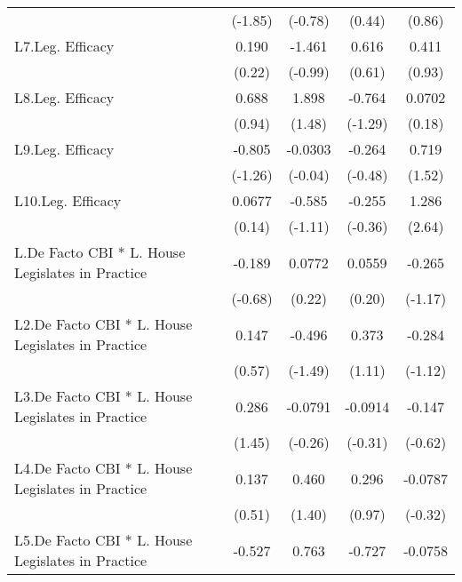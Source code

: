 {\begin{longtable}{l*{4}{c}}
                &  (-1.85)         &  (-0.78)         &   (0.44)         &   (0.86)         \\
[1em]
L7.Leg. Efficacy&    0.190         &   -1.461         &    0.616         &    0.411         \\
                &   (0.22)         &  (-0.99)         &   (0.61)         &   (0.93)         \\
[1em]
L8.Leg. Efficacy&    0.688         &    1.898         &   -0.764         &   0.0702         \\
                &   (0.94)         &   (1.48)         &  (-1.29)         &   (0.18)         \\
[1em]
L9.Leg. Efficacy&   -0.805         &  -0.0303         &   -0.264         &    0.719         \\
                &  (-1.26)         &  (-0.04)         &  (-0.48)         &   (1.52)         \\
[1em]
L10.Leg. Efficacy&   0.0677         &   -0.585         &   -0.255         &    1.286\sym{**} \\
                &   (0.14)         &  (-1.11)         &  (-0.36)         &   (2.64)         \\
[1em]
L.De Facto CBI * L. House Legislates in Practice&   -0.189         &   0.0772         &   0.0559         &   -0.265         \\
                &  (-0.68)         &   (0.22)         &   (0.20)         &  (-1.17)         \\
[1em]
L2.De Facto CBI * L. House Legislates in Practice&    0.147         &   -0.496         &    0.373         &   -0.284         \\
                &   (0.57)         &  (-1.49)         &   (1.11)         &  (-1.12)         \\
[1em]
L3.De Facto CBI * L. House Legislates in Practice&    0.286         &  -0.0791         &  -0.0914         &   -0.147         \\
                &   (1.45)         &  (-0.26)         &  (-0.31)         &  (-0.62)         \\
[1em]
L4.De Facto CBI * L. House Legislates in Practice&    0.137         &    0.460         &    0.296         &  -0.0787         \\
                &   (0.51)         &   (1.40)         &   (0.97)         &  (-0.32)         \\
[1em]
L5.De Facto CBI * L. House Legislates in Practice&   -0.527\sym{*}  &    0.763         &   -0.727\sym{**} &  -0.0758         \\

\end{longtable}}
